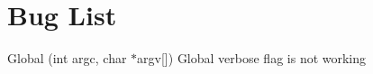\chapter{Bug List}
\hypertarget{bug}{}\label{bug}

\begin{DoxyRefList}
\item[Global \doxylink{classutils_1_1StartupHandler_a9cdd57841cee245c1a1c94b0efe6549c}{utils\+::Startup\+Handler\+::get\+Options} (int argc, char \texorpdfstring{$\ast$}{*}argv\mbox{[}\mbox{]})]\label{bug__bug000001}%
%
 Global verbose flag is not working
\end{DoxyRefList}